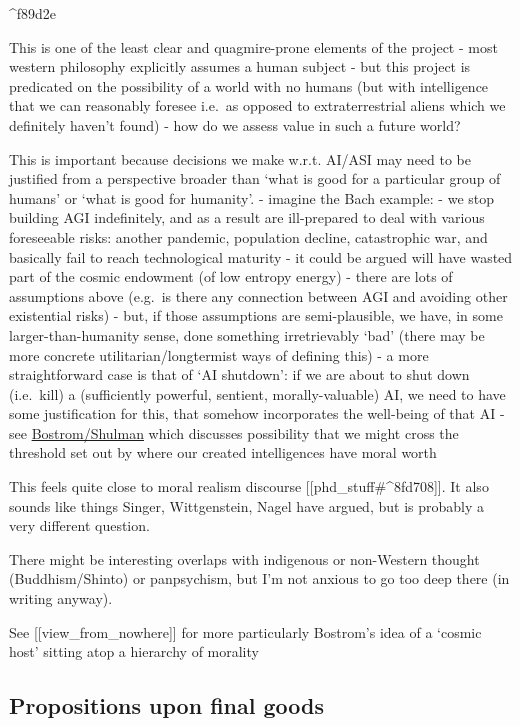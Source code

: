 \documentclass[
]{article}
\begin{document}
\^{}f89d2e

This is one of the least clear and quagmire-prone elements of the
project - most western philosophy explicitly assumes a human subject -
but this project is predicated on the possibility of a world with no
humans (but with intelligence that we can reasonably foresee i.e.~as
opposed to extraterrestrial aliens which we definitely haven't found) -
how do we assess value in such a future world?

This is important because decisions we make w.r.t. AI/ASI may need to be
justified from a perspective broader than `what is good for a particular
group of humans' or `what is good for humanity'. - imagine the Bach
example: - we stop building AGI indefinitely, and as a result are
ill-prepared to deal with various foreseeable risks: another pandemic,
population decline, catastrophic war, and basically fail to reach
technological maturity - it could be argued will have wasted part of the
cosmic endowment (of low entropy energy) - there are lots of assumptions
above (e.g.~is there any connection between AGI and avoiding other
existential risks) - but, if those assumptions are semi-plausible, we
have, in some larger-than-humanity sense, done something irretrievably
`bad' (there may be more concrete utilitarian/longtermist ways of
defining this) - a more straightforward case is that of `AI shutdown':
if we are about to shut down (i.e.~kill) a (sufficiently powerful,
sentient, morally-valuable) AI, we need to have some justification for
this, that somehow incorporates the well-being of that AI - see
\href{https://nickbostrom.com/propositions.pdf}{Bostrom/Shulman} which
discusses possibility that we might cross the threshold set out by where
our created intelligences have moral worth

This feels quite close to moral realism discourse
{[}{[}phd\_stuff\#\^{}8fd708{]}{]}. It also sounds like things Singer,
Wittgenstein, Nagel have argued, but is probably a very different
question.

There might be interesting overlaps with indigenous or non-Western
thought (Buddhism/Shinto) or panpsychism, but I'm not anxious to go too
deep there (in writing anyway).

See {[}{[}view\_from\_nowhere{]}{]} for more particularly Bostrom's idea
of a `cosmic host' sitting atop a hierarchy of morality

\subsection{Propositions upon final
goods}\label{propositions-upon-final-goods}
\end{document}
